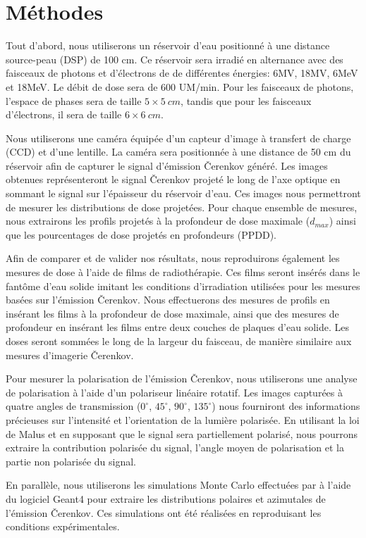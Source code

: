 \documentclass{Thesis}
\begin{document}
\section*{Méthodes}
Tout d'abord, nous utiliserons un réservoir d'eau positionné à une distance source-peau (DSP) de 100 cm.
Ce réservoir sera irradié en alternance avec des faisceaux de photons et d'électrons de de différentes énergies: 6MV, 18MV, 6MeV et 18MeV.
Le débit de dose sera de 600 UM/min.
Pour les faisceaux de photons, l'espace de phases sera de taille $5 \times \SI{5}{cm}$, tandis que pour les faisceaux d'électrons, il sera de taille $6 \times \SI{6}{cm}$.

Nous utiliserons une caméra équipée d'un capteur d'image à transfert de charge (CCD) et d'une lentille.
La caméra sera positionnée à une distance de 50 cm du réservoir afin de capturer le signal d'émission Čerenkov généré.
Les images obtenues représenteront le signal Čerenkov projeté le long de l'axe optique en sommant le signal sur l'épaisseur du réservoir d'eau.
Ces images nous permettront de mesurer les distributions de dose projetées.
Pour chaque ensemble de mesures, nous extrairons les profils projetés à la profondeur de dose maximale ($d_{max}$) ainsi que les pourcentages de dose projetés en profondeurs (PPDD).

Afin de comparer et de valider nos résultats, nous reproduirons également les mesures de dose à l'aide de films de radiothérapie.
Ces films seront insérés dans le fantôme d'eau solide imitant les conditions d'irradiation utilisées pour les mesures basées sur l'émission Čerenkov.
Nous effectuerons des mesures de profils en insérant les films à la profondeur de dose maximale, ainsi que des mesures de profondeur en insérant les films entre deux couches de plaques d'eau solide.
Les doses seront sommées le long de la largeur du faisceau, de manière similaire aux mesures d'imagerie Čerenkov.

Pour mesurer la polarisation de l'émission Čerenkov, nous utiliserons une analyse de polarisation à l'aide d'un polariseur linéaire rotatif.
Les images capturées à quatre angles de transmission ($0^\circ$, $45^\circ$, $90^\circ$, $135^\circ$) nous fourniront des informations précieuses sur l'intensité et l'orientation de la lumière polarisée.
En utilisant la loi de Malus et en supposant que le signal sera partiellement polarisé, nous pourrons extraire la contribution polarisée du signal, l'angle moyen de polarisation et la partie non polarisée du signal.

En parallèle, nous utiliserons les simulations Monte Carlo effectuées par  à l'aide du logiciel Geant4 pour extraire les distributions polaires et azimutales de l'émission Čerenkov.
Ces simulations ont été réalisées en reproduisant les conditions expérimentales.
\end{document}

